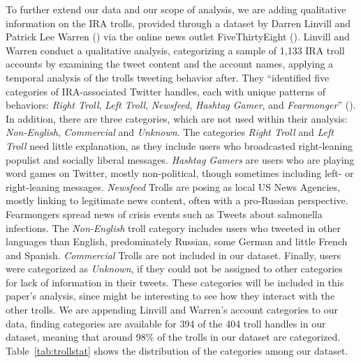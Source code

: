 \documentclass[12pt, titlepage=true, toc=bib]{scrartcl}
\begin{document}
To further extend our data and our scope of analysis, we are adding qualitative information on the IRA trolls, provided through a dataset by Darren Linvill and Patrick Lee Warren (\cite*{linvill_troll_2018}) via the online news outlet FiveThirtyEight (\cite{roeder_why_2018}). Linvill and Warren conduct a qualitative analysis, categorizing a sample of 1,133 IRA troll accounts by examining the tweet content and the account names, applying a temporal analysis of the trolls tweeting behavior after. They ``identified five categories of IRA-associated Twitter handles, each with unique patterns of behaviors: \textit{Right Troll}, \textit{Left Troll}, \textit{Newsfeed}, \textit{Hashtag Gamer}, and \textit{Fearmonger}'' (\cite[6]{linvill_troll_2018}). In addition, there are three categories, which are not used within their analysis: \textit{Non-English}, \textit{Commercial} and \textit{Unknown}. The categories \textit{Right Troll} and \textit{Left Troll} need little explanation, as they include users who broadcasted right-leaning populist and socially liberal messages. \textit{Hashtag Gamers} are users who are playing word games on Twitter, mostly non-political, though sometimes including left- or right-leaning messages. \textit{Newsfeed} Trolls are posing as local US News Agencies, mostly linking to legitimate news content, often with a pro-Russian perspective. Fearmongers spread news of crisis events such as Tweets about salmonella infections. The \textit{Non-English} troll category includes users who tweeted in other languages than English, predominately Russian, some German and little French and Spanish. \textit{Commercial} Trolls are not included in our dataset. Finally, users were categorized as \textit{Unknown}, if they could not be assigned to other categories for lack of information in their tweets. These categories will be included in this paper's analysis, since might be interesting to see how they interact with the other trolls. We are appending Linvill and Warren's account categories to our data, finding categories are available for 394 of the 404 troll handles in our dataset, meaning that around 98\% of the trolls in our dataset are categorized. Table~\ref{tab:trollstat} shows the distribution of the categories among our dataset.
\end{document}
